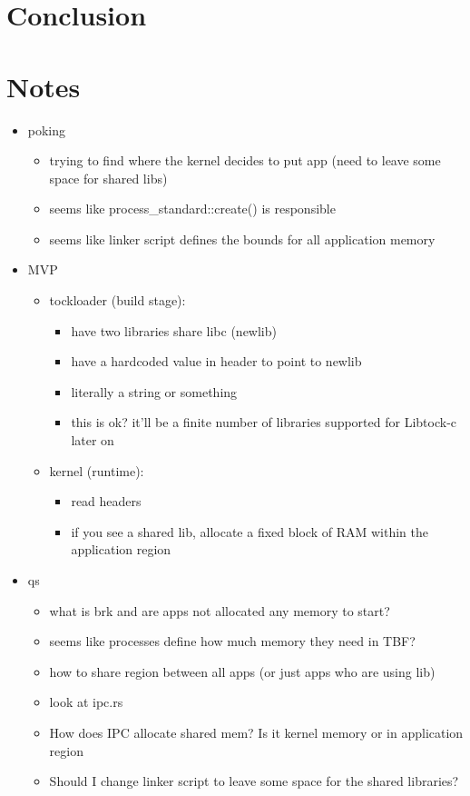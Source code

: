 \documentclass{article}
\begin{document}
\section*{Conclusion}

\section*{Notes}
\begin{itemize}
    \item poking
        \begin{itemize}
            \item trying to find where the kernel decides to put app (need to leave some space for shared libs)
            \item seems like process\_standard::create() is responsible
            \item seems like linker script defines the bounds for all application memory
        \end{itemize}

    \item MVP
    \begin{itemize}
        \item tockloader (build stage):  
        \begin{itemize}
            \item have two libraries share libc (newlib)
            \item have a hardcoded value in header to point to newlib
            \item literally a string or something
            \item this is ok? it'll be a finite number of libraries supported for Libtock-c later on
        \end{itemize}
    \item kernel (runtime):
    \begin{itemize}
            \item read headers
            \item if you see a shared lib, allocate a fixed block of RAM within the application region
    \end{itemize}
    \end{itemize}


    \item qs
        \begin{itemize}
            \item  what is brk and are apps not allocated any memory to start?
            \item  seems like processes define how much memory they need in TBF?
            \item  how to share region between all apps (or just apps who are using lib)
            \item  look at ipc.rs
            \item  How does IPC allocate shared mem? Is it kernel memory or in application region
            \item  Should I change linker script to leave some space for the shared libraries?
        \end{itemize}
\end{itemize}
\end{document}
